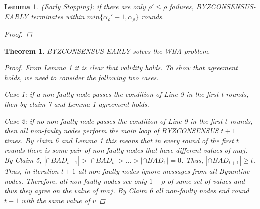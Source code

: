 \documentclass[conference]{IEEEtran}
\newtheorem{t1}{Theorem}
\newtheorem{l1}{Lemma}
\begin{document}
\begin{l1}
(Early Stopping): if there are only $\rho' \leq \rho$ failures,  BYZCONSENSUS-EARLY terminates within $min\{\alpha_\rho' + 1, \alpha_\rho\}$ rounds. 
\begin{proof}
\end{proof}
\end{l1}

\begin{t1}
BYZCONSENSUS-EARLY solves the WBA problem.
\begin{proof}
From Lemma 1 it is clear that validity holds. To show that agreement holds, we need to consider the following two cases. 

Case 1: if a non-faulty node passes the condition of Line 9 in the first t rounds, then by claim 7 and Lemma 1 agreement holds.  

Case 2: if no non-faulty node passes the condition of Line 9 in the first $t$ rounds, then all non-faulty nodes perform the main loop of BYZCONSENSUS $t + 1$ times. By claim 6 and Lemma 1 this means that in every round of the first $t$ rounds there is some pair of non-faulty nodes that have different values of $maj$. By Claim 5, $|\cap BAD_{t+1}| > | \cap BAD_t| > ... > |\cap BAD_1| = 0$. Thus, $|\cap BAD_{t+1}| \geq t$. Thus, in iteration $t + 1$ all non-faulty nodes ignore messages from all Byzantine nodes. Therefore, all non-faulty nodes see only $1 - \rho$ of same set of values  and thus they agree on the value of $maj$. By Claim 6 all non-faulty nodes end round $t + 1$ with the same value of $v$
\end{proof}
\end{t1}
\end{document}
